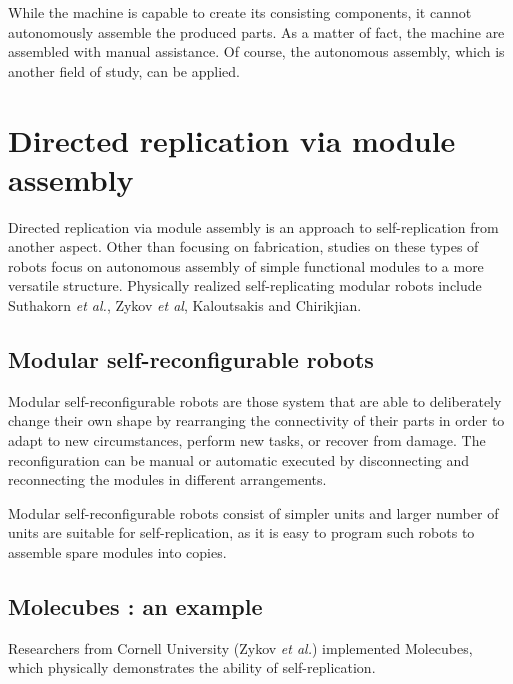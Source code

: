 \documentclass[12pt,twoside]{article}
\theoremstyle{plain}
\theoremstyle{definition}
\theoremstyle{remark}
\newcommand{\etal}{\textit{et al.}}
\begin{document}
While the machine is capable to create its consisting components, it cannot autonomously assemble the produced parts. As a matter of fact, the machine are assembled with manual assistance. Of course, the autonomous assembly, which is another field of study, can be applied.

\section{Directed replication via module assembly}
\label{sec:module}
Directed replication via module assembly is an approach to self-replication from another aspect. Other than focusing on fabrication, studies on these types of robots focus on autonomous assembly of simple functional modules to a more versatile structure. Physically realized self-replicating modular robots include Suthakorn \etal\cite{suthakorn_autonomous_2003}, Zykov \textit{et al}\cite{zykov_self-reproducing_2005}, Kaloutsakis and Chirikjian\cite{kaloutsakis_stochastic_2011}.

\subsection{Modular self-reconfigurable robots}
Modular self-reconfigurable robots are those system that are able to deliberately
change their own shape by rearranging the connectivity of their parts in order to
adapt to new circumstances, perform new tasks, or recover from damage\cite{yim_modular_2007}. The reconfiguration can be manual or automatic executed by disconnecting and reconnecting the modules in different arrangements.

Modular self-reconfigurable robots consist of simpler units and larger number of units are suitable for self-replication, as it is easy to program such robots to assemble spare modules into copies. 

\subsection{Molecubes : an example}
Researchers from Cornell University (Zykov \etal) implemented Molecubes, which physically demonstrates the ability of self-replication\cite{zykov_self-reproducing_2005}\cite{zykov_evolved_2007}. 
\end{document}
